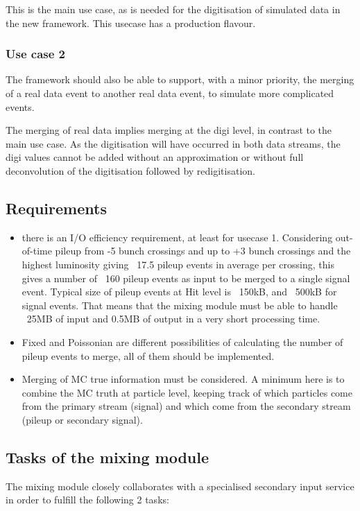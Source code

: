 \documentclass[draftmode]{memarticle}
\begin{document}
This is the main use case, as is needed for the digitisation of simulated data in the new framework.
This usecase has a production flavour.
\subsubsection { Use case 2}

The framework should also be able to support, with a minor priority, the merging of a real data  event to another real data event, to simulate more complicated events.

The merging of real data implies merging at the digi level, in contrast to 
the main use case. As the digitisation will have occurred in both data streams,
the digi values cannot be added without an approximation or without full 
deconvolution of the digitisation followed by redigitisation. \\


\subsection { Requirements }
\begin {itemize}

\item
there is an I/O efficiency requirement, at least for usecase 1. 
Considering out-of-time pileup from -5 bunch crossings and up to +3 bunch 
crossings and the highest luminosity giving ~17.5 pileup events in average 
per crossing, this gives a number of ~160 pileup events as input to be merged 
to a single signal event. Typical size of pileup events at Hit level is ~150kB, and ~500kB for signal events.
That means that the mixing module must be able to handle ~25MB of input and 
0.5MB of output in a 
very short processing time.
\item
Fixed and Poissonian are different possibilities of calculating the number of 
pileup events to merge, all of them should be implemented.
\item
Merging of MC true information must be considered. A minimum here is to 
combine the MC truth at particle level, keeping track of which particles
come from the primary stream (signal) and which come from the secondary stream
 (pileup or secondary signal).


\end {itemize}
\subsection {Tasks of the mixing module} 
The mixing module closely collaborates with a specialised secondary input service in order to fulfill the following 2 tasks: 
\end{document}
